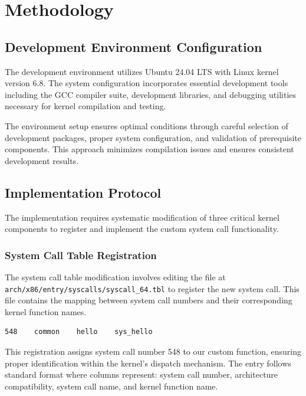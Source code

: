 \documentclass[conference]{IEEEtran}
\begin{document}
\section{Methodology}

\subsection{Development Environment Configuration}

The development environment utilizes Ubuntu 24.04 \gls{LTS} with Linux kernel version 6.8. The system configuration incorporates essential development tools including the \gls{GCC} compiler suite, development libraries, and debugging utilities necessary for kernel compilation and testing.

The environment setup ensures optimal conditions through careful selection of development packages, proper system configuration, and validation of prerequisite components. This approach minimizes compilation issues and ensures consistent development results.

\subsection{Implementation Protocol}

The implementation requires systematic modification of three critical kernel components to register and implement the custom system call functionality.

\subsubsection{System Call Table Registration}

The system call table modification involves editing the file at \texttt{arch/x86/entry/syscalls/syscall\_64.tbl} to register the new system call. This file contains the mapping between system call numbers and their corresponding kernel function names.

\begin{lstlisting}[caption=System Call Table Entry]
548    common    hello    sys_hello
\end{lstlisting}

This registration assigns system call number 548 to our custom function, ensuring proper identification within the kernel's dispatch mechanism. The entry follows standard format where columns represent: system call number, architecture compatibility, system call name, and kernel function name.
\end{document}

